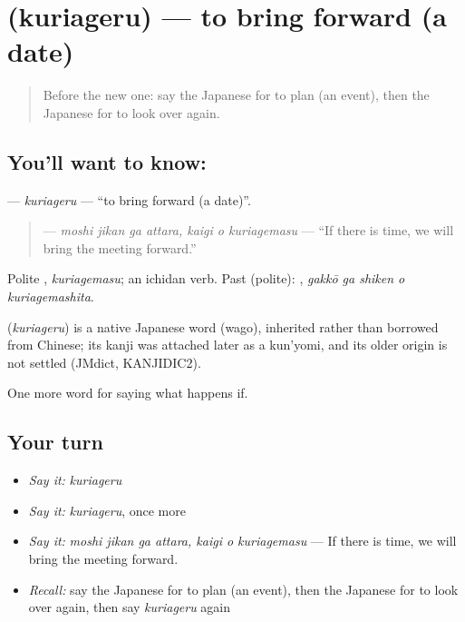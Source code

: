 \section[\texorpdfstring{\ja{くりあげる} (kuriageru)}{くりあげる (kuriageru)}]{ (kuriageru) — to bring forward (a date)}

\label{lesson:JA-C513-kuriageru}



\begin{quote}
Before the new one: say the Japanese for to plan (an event), then the Japanese for to look over again.
\end{quote}

\subsection*{You'll want to know: }
\textbf{} — \emph{kuriageru} — \textquotedblleft{}to bring forward (a date)\textquotedblright{}.

\begin{quote}
\textbf{   } — \emph{moshi jikan ga attara, kaigi o kuriagemasu} — \textquotedblleft{}If there is time, we will bring the meeting forward.\textquotedblright{}
\end{quote}

Polite \textbf{}, \emph{kuriagemasu}; an ichidan verb. Past (polite): \textbf{  }, \emph{gakkō ga shiken o kuriagemashita}.

\begin{cousinweb}
\textbf{} (\emph{kuriageru}) is a native Japanese word (wago), inherited rather than borrowed from Chinese; its kanji was attached later as a kun'yomi, and its older origin is not settled (JMdict, KANJIDIC2).
\end{cousinweb}

\begin{grammarlens}[title={What you've built}]
One more word for saying what happens if.
\end{grammarlens}

\subsection*{Your turn}
\begin{itemize}
\raggedright
  \item \emph{Say it:} \emph{kuriageru}
  \item \emph{Say it:} \emph{kuriageru}, once more
  \item \emph{Say it:} \emph{moshi jikan ga attara, kaigi o kuriagemasu} — If there is time, we will bring the meeting forward.
  \item \emph{Recall:} say the Japanese for to plan (an event), then the Japanese for to look over again, then say \emph{kuriageru} again
\end{itemize}

